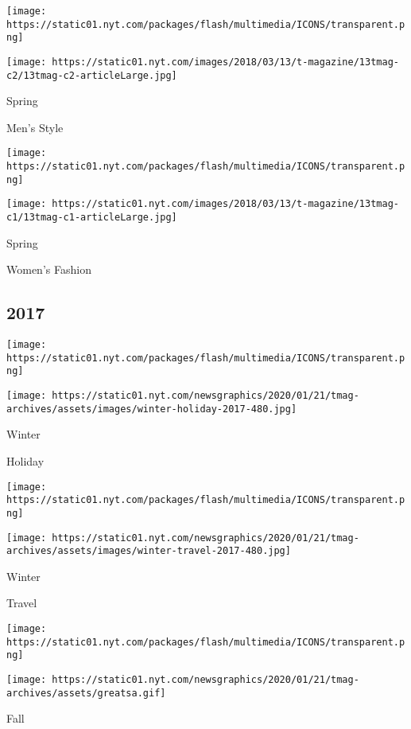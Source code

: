 \texttt{[image: https://static01.nyt.com/packages/flash/multimedia/ICONS/transparent.png]}

\texttt{[image: https://static01.nyt.com/images/2018/03/13/t-magazine/13tmag-c2/13tmag-c2-articleLarge.jpg]}

Spring

Men's Style

\href{https://www.nytimes.com/issue/t-magazine/2018/02/09/ts-feb-18-womens-fashion-issue}{}

\texttt{[image: https://static01.nyt.com/packages/flash/multimedia/ICONS/transparent.png]}

\texttt{[image: https://static01.nyt.com/images/2018/03/13/t-magazine/13tmag-c1/13tmag-c1-articleLarge.jpg]}

Spring

Women's Fashion

\hypertarget{2017}{%
\subsection{2017}\label{2017}}

\href{https://www.nytimes.com/issue/t-magazine/2017/11/17/ts-dec-3-holiday-issue}{}

\texttt{[image: https://static01.nyt.com/packages/flash/multimedia/ICONS/transparent.png]}

\texttt{[image: https://static01.nyt.com/newsgraphics/2020/01/21/tmag-archives/assets/images/winter-holiday-2017-480.jpg]}

Winter

Holiday

\href{https://www.nytimes.com/issue/t-magazine/2017/10/27/ts-nov-12-travel-issue}{}

\texttt{[image: https://static01.nyt.com/packages/flash/multimedia/ICONS/transparent.png]}

\texttt{[image: https://static01.nyt.com/newsgraphics/2020/01/21/tmag-archives/assets/images/winter-travel-2017-480.jpg]}

Winter

Travel

\href{https://www.nytimes.com/issue/t-magazine/2017/10/02/ts-oct-22-the-greats-issue}{}

\texttt{[image: https://static01.nyt.com/packages/flash/multimedia/ICONS/transparent.png]}

\texttt{[image: https://static01.nyt.com/newsgraphics/2020/01/21/tmag-archives/assets/greatsa.gif]}

Fall

